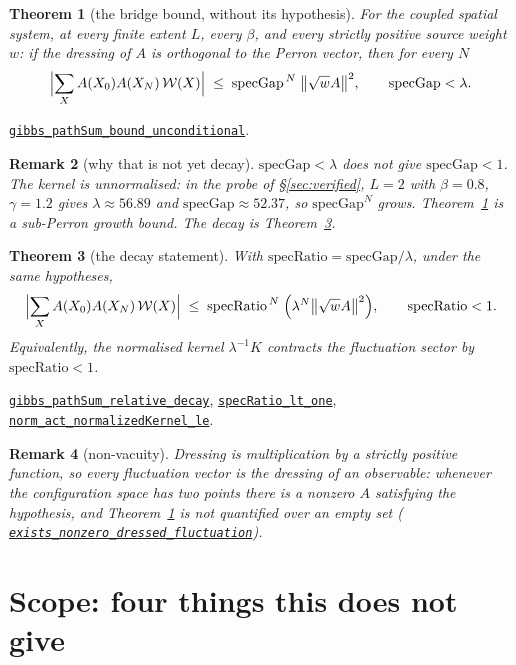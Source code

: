 \documentclass[11pt]{article}
\newtheorem{theorem}{Theorem}[section]
\newtheorem{remark}[theorem]{Remark}
\theoremstyle{definition}
\newcommand{\anchor}{9704b3f3c0d576bb40c43caa5360fbd64dfa1643}
\newcommand{\osline}[3]{%
  \href{https://github.com/lluiseriksson/THE-ERIKSSON-PROGRAMME/blob/\anchor/YangMills/OS/#1.lean\#L#2}{\nolinkurl{#3}}}
\begin{document}
\begin{theorem}[the bridge bound, without its hypothesis]\label{thm:endpoint}
For the coupled spatial system, at every finite extent $L$, every $\beta$, and
every strictly positive source weight $w$: if the dressing of $A$ is orthogonal
to the Perron vector, then for every $N$
\[
  \Bigl|\sum_X A(X_0)A(X_N)\,\mathcal{W}(X)\Bigr|
  \;\le\; \mathrm{specGap}^{\,N}\;\bigl\|\sqrt{w}A\bigr\|^{2},
  \qquad \mathrm{specGap}<\lambda .
\]
\end{theorem}

\osline{SpatialSpectral}{427}{gibbs\_pathSum\_bound\_unconditional}.

\begin{remark}[why that is not yet decay]\label{rem:notdecay}
$\mathrm{specGap}<\lambda$ does not give $\mathrm{specGap}<1$.  The kernel is
unnormalised: in the probe of §\ref{sec:verified}, $L=2$ with $\beta=0.8$,
$\gamma=1.2$ gives $\lambda\approx56.89$ and
$\mathrm{specGap}\approx52.37$, so $\mathrm{specGap}^{N}$ grows.
Theorem~\ref{thm:endpoint} is a \emph{sub-Perron growth} bound.  The decay is
Theorem~\ref{thm:reldecay}.
\end{remark}

\begin{theorem}[the decay statement]\label{thm:reldecay}
With $\mathrm{specRatio}=\mathrm{specGap}/\lambda$, under the same hypotheses,
\[
  \Bigl|\sum_X A(X_0)A(X_N)\,\mathcal{W}(X)\Bigr|
  \;\le\; \mathrm{specRatio}^{\,N}\;\Bigl(\lambda^{N}
  \bigl\|\sqrt{w}A\bigr\|^{2}\Bigr),
  \qquad \mathrm{specRatio}<1 .
\]
Equivalently, the normalised kernel $\lambda^{-1}K$ contracts the fluctuation
sector by $\mathrm{specRatio}<1$.
\end{theorem}

\osline{SpatialSpectral}{467}{gibbs\_pathSum\_relative\_decay},
\osline{SpatialSpectral}{334}{specRatio\_lt\_one},
\osline{SpatialSpectral}{357}{norm\_act\_normalizedKernel\_le}.

\begin{remark}[non-vacuity]
Dressing is multiplication by a strictly positive function, so every fluctuation
vector is the dressing of an observable: whenever the configuration space has
two points there is a \emph{nonzero} $A$ satisfying the hypothesis, and
Theorem~\ref{thm:endpoint} is not quantified over an empty set
(\osline{SpatialSpectral}{493}{exists\_nonzero\_dressed\_fluctuation}).
\end{remark}

\section{Scope: four things this does not give}\label{sec:scope}
\end{document}

